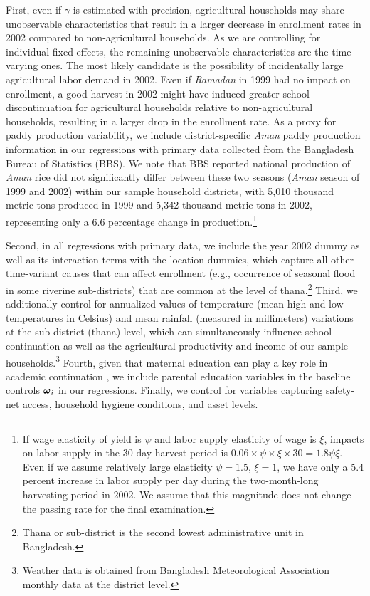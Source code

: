\documentclass[12pt,letterpaper]{article}
\newcommand{\bfomega}{\ensuremath{\mbox{\boldmath $\omega$}}}
\newcommand{\0}{\ensuremath{\mbox{\boldmath $0$}}}
\begin{document}
First, even if $\gamma$ is estimated with precision, agricultural households may share unobservable characteristics that result in a larger decrease in enrollment rates in 2002 compared to non-agricultural households. As we are controlling for individual fixed effects, the remaining unobservable characteristics are the time-varying ones. The most likely candidate is the possibility of incidentally large agricultural labor demand in 2002. Even if \textit{Ramadan} in 1999 had no impact on enrollment, a good harvest in 2002 might have induced greater school discontinuation for agricultural households relative to non-agricultural households, resulting in a larger drop in the enrollment rate. As a proxy for paddy production variability, we include district-specific \textit{Aman} paddy production information in our regressions with primary data collected from the Bangladesh Bureau of Statistics (BBS). We note that BBS reported national production of \textit{Aman} rice did not significantly differ between these two seasons (\textit{Aman} season of 1999 and 2002) within our sample household districts, with 5,010 thousand metric tons produced in 1999 and 5,342 thousand metric tons in 2002, representing only a 6.6 percentage change in production.\footnote{If wage elasticity of yield is $\psi$ and labor supply elasticity of wage is $\xi$, impacts on labor supply in the 30-day harvest period is $0.06\times\psi\times\xi\times 30 = 1.8\psi\xi$. Even if we assume relatively large elasticity $\psi = 1.5$, $\xi=1$, we have only a 5.4 percent increase in labor supply per day during the two-month-long harvesting period in 2002. We assume that this magnitude does not change the passing rate for the final examination.} 

Second, in all regressions with primary data, we include the year 2002 dummy as well as its interaction terms with the location dummies, which capture all other time-variant causes that can affect enrollment (e.g., occurrence of seasonal flood in some riverine sub-districts) that are common at the level of thana.\footnote{Thana or sub-district is the second lowest administrative unit in Bangladesh.} Third, we additionally control for annualized values of temperature (mean high and low temperatures in Celsius) and mean rainfall (measured in millimeters) variations at the sub-district (thana) level, which can simultaneously influence school continuation as well as the agricultural productivity and income of our sample households.\footnote{Weather data is obtained from Bangladesh Meteorological Association monthly data at the district level.} Fourth, given that maternal education can play a key role in academic continuation \citep{BFRV1999}, we include parental education variables in the baseline controls $\bfomega_{i}$ in our regressions. Finally, we control for variables capturing safety-net access, household hygiene conditions, and asset levels.
\end{document}
